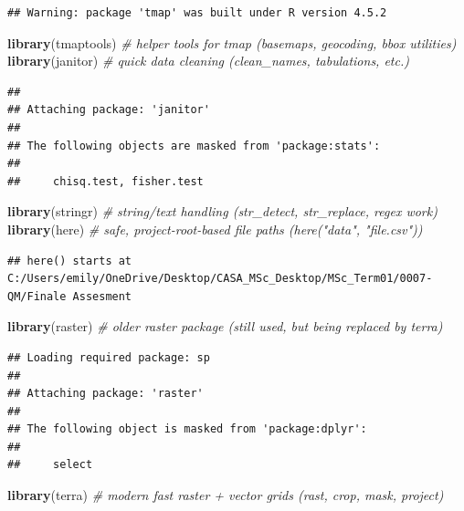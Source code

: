 \documentclass[
]{article}
\newenvironment{Shaded}{\begin{snugshade}}{\end{snugshade}}
\newcommand{\CommentTok}[1]{\textcolor[rgb]{0.56,0.35,0.01}{\textit{#1}}}
\newcommand{\FunctionTok}[1]{\textcolor[rgb]{0.13,0.29,0.53}{\textbf{#1}}}
\newcommand{\NormalTok}[1]{#1}
\begin{document}
\begin{verbatim}
## Warning: package 'tmap' was built under R version 4.5.2
\end{verbatim}

\begin{Shaded}
\begin{Highlighting}[]
\FunctionTok{library}\NormalTok{(tmaptools)       }\CommentTok{\# helper tools for tmap (basemaps, geocoding, bbox utilities)}
\FunctionTok{library}\NormalTok{(janitor)         }\CommentTok{\# quick data cleaning (clean\_names, tabulations, etc.)}
\end{Highlighting}
\end{Shaded}

\begin{verbatim}
## 
## Attaching package: 'janitor'
## 
## The following objects are masked from 'package:stats':
## 
##     chisq.test, fisher.test
\end{verbatim}

\begin{Shaded}
\begin{Highlighting}[]
\FunctionTok{library}\NormalTok{(stringr)         }\CommentTok{\# string/text handling (str\_detect, str\_replace, regex work)}
\FunctionTok{library}\NormalTok{(here)            }\CommentTok{\# safe, project{-}root{-}based file paths (here("data", "file.csv"))}
\end{Highlighting}
\end{Shaded}

\begin{verbatim}
## here() starts at C:/Users/emily/OneDrive/Desktop/CASA_MSc_Desktop/MSc_Term01/0007-QM/Finale Assesment
\end{verbatim}

\begin{Shaded}
\begin{Highlighting}[]
\FunctionTok{library}\NormalTok{(raster)          }\CommentTok{\# older raster package (still used, but being replaced by terra)}
\end{Highlighting}
\end{Shaded}

\begin{verbatim}
## Loading required package: sp
## 
## Attaching package: 'raster'
## 
## The following object is masked from 'package:dplyr':
## 
##     select
\end{verbatim}

\begin{Shaded}
\begin{Highlighting}[]
\FunctionTok{library}\NormalTok{(terra)           }\CommentTok{\# modern fast raster + vector grids (rast, crop, mask, project)}
\end{Highlighting}
\end{Shaded}
\end{document}

